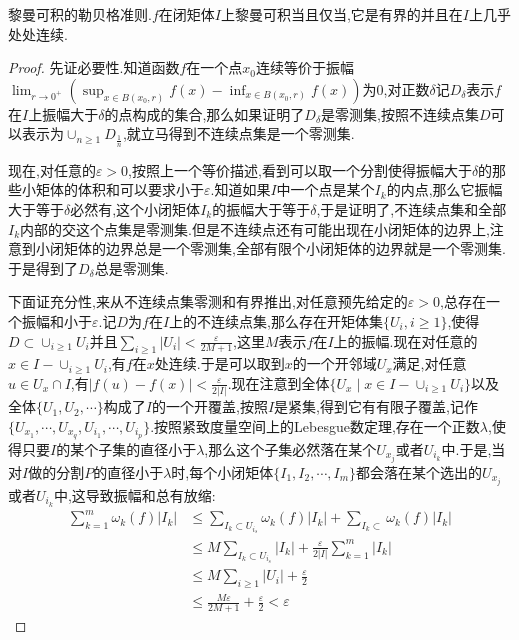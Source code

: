 黎曼可积的勒贝格准则.$f$在闭矩体$I$上黎曼可积当且仅当,它是有界的并且在$I$上几乎处处连续.
\begin{proof}
	
	先证必要性.知道函数$f$在一个点$x_0$连续等价于振幅$\lim_{r\to0^+}\left(\sup_{x\in B(x_0,r)}f(x)-\inf_{x\in B(x_0,r)}f(x)\right)$为0,对正数$\delta$记$D_{\delta}$表示$f$在$I$上振幅大于$\delta$的点构成的集合,那么如果证明了$D_{\delta}$是零测集,按照不连续点集$D$可以表示为$\cup_{n\ge1}D_{\frac{1}{n}}$,就立马得到不连续点集是一个零测集.
	
	现在,对任意的$\varepsilon>0$,按照上一个等价描述,看到可以取一个分割使得振幅大于$\delta$的那些小矩体的体积和可以要求小于$\varepsilon$.知道如果$I$中一个点是某个$I_k$的内点,那么它振幅大于等于$\delta$必然有,这个小闭矩体$I_k$的振幅大于等于$\delta$,于是证明了,不连续点集和全部$I_k$内部的交这个点集是零测集.但是不连续点还有可能出现在小闭矩体的边界上,注意到小闭矩体的边界总是一个零测集,全部有限个小闭矩体的边界就是一个零测集.于是得到了$D_{\delta}$总是零测集.
	
	下面证充分性,来从不连续点集零测和有界推出,对任意预先给定的$\varepsilon>0$,总存在一个振幅和小于$\varepsilon$.记$D$为$f$在$I$上的不连续点集,那么存在开矩体集$\{U_i,i\ge1\}$,使得$D\subset\cup_{i\ge1}U_i$并且$\sum_{i\ge1}|U_i|<\frac{\varepsilon}{2M+1}$,这里$M$表示$f$在$I$上的振幅.现在对任意的$x\in I-\cup_{i\ge1}U_i$,有$f$在$x$处连续.于是可以取到$x$的一个开邻域$U_x$满足,对任意$u\in U_x\cap I$,有$|f(u)-f(x)|<\frac{\varepsilon}{2|I|}$.现在注意到全体$\{U_x\mid x\in I-\cup_{i\ge1}U_i\}$以及全体$\{U_1,U_2,\cdots\}$构成了$I$的一个开覆盖,按照$I$是紧集,得到它有有限子覆盖,记作$\{U_{x_1},\cdots,U_{x_q},U_{i_1},\cdots,U_{i_p}\}$.按照紧致度量空间上的Lebesgue数定理,存在一个正数$\lambda$,使得只要$I$的某个子集的直径小于$\lambda$,那么这个子集必然落在某个$U_{x_j}$或者$U_{i_k}$中.于是,当对$I$做的分割$P$的直径小于$\lambda$时,每个小闭矩体$\{I_1,I_2,\cdots,I_m\}$都会落在某个选出的$U_{x_j}$或者$U_{i_k}$中,这导致振幅和总有放缩:
	\begin{align*}
	\sum_{k=1}^{m}\omega_k(f)|I_k|&\le \sum_{I_k\subset U_{i_s}}\omega_k(f)|I_k|+\sum_{I_k\subset}\omega_k(f)|I_k|  \\
	&\le M\sum_{I_k\subset U_{i_s}}|I_k|+\frac{\varepsilon}{2|I|}\sum_{k=1}^{m}|I_k| \\
	&\le M\sum_{i\ge1}|U_i|+\frac{\varepsilon}{2} \\
	&\le \frac{M\varepsilon}{2M+1}+\frac{\varepsilon}{2}<\varepsilon
	\end{align*}
	
\end{proof}

